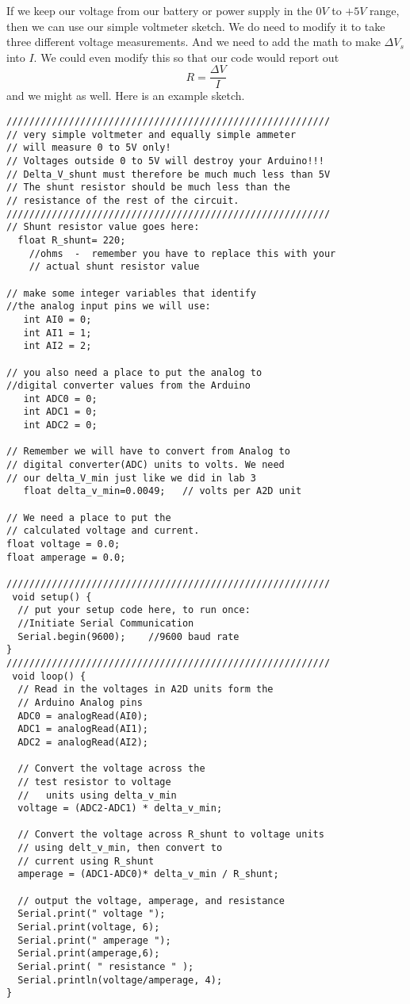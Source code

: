 If we keep our voltage from our battery or power supply in the $0\unit{V}$
to $+5\unit{V}$ range, then we can use our simple voltmeter sketch. We do
need to modify it to take three different voltage measurements. And we need
to add the math to make $\Delta V_{s}$ into $I.$ We could even modify this
so that our code would report out 
\begin{equation*}
R=\frac{\Delta V}{I}
\end{equation*}%
and we might as well. Here is an example sketch.
\begin{lstlisting}[language=Arduino]
 /////////////////////////////////////////////////////////
// very simple voltmeter and equally simple ammeter
// will measure 0 to 5V only!
// Voltages outside 0 to 5V will destroy your Arduino!!!
// Delta_V_shunt must therefore be much much less than 5V
// The shunt resistor should be much less than the
// resistance of the rest of the circuit.
/////////////////////////////////////////////////////////
// Shunt resistor value goes here:
  float R_shunt= 220;   
  	//ohms  -  remember you have to replace this with your 
  	// actual shunt resistor value
 
// make some integer variables that identify 
//the analog input pins we will use:
   int AI0 = 0;
   int AI1 = 1;
   int AI2 = 2;
 
// you also need a place to put the analog to 
//digital converter values from the Arduino
   int ADC0 = 0;
   int ADC1 = 0;
   int ADC2 = 0;
 
// Remember we will have to convert from Analog to 
// digital converter(ADC) units to volts. We need
// our delta_V_min just like we did in lab 3 
   float delta_v_min=0.0049;   // volts per A2D unit
  
// We need a place to put the 
// calculated voltage and current.
float voltage = 0.0;
float amperage = 0.0;
 
/////////////////////////////////////////////////////////
 void setup() {
  // put your setup code here, to run once:
  //Initiate Serial Communication
  Serial.begin(9600);    //9600 baud rate
}
/////////////////////////////////////////////////////////
 void loop() {
  // Read in the voltages in A2D units form the 
  // Arduino Analog pins
  ADC0 = analogRead(AI0); 
  ADC1 = analogRead(AI1);
  ADC2 = analogRead(AI2);
  
  // Convert the voltage across the 
  // test resistor to voltage 
  //   units using delta_v_min
  voltage = (ADC2-ADC1) * delta_v_min;
 
  // Convert the voltage across R_shunt to voltage units  
  // using delt_v_min, then convert to
  // current using R_shunt
  amperage = (ADC1-ADC0)* delta_v_min / R_shunt;
 
  // output the voltage, amperage, and resistance
  Serial.print(" voltage ");
  Serial.print(voltage, 6);  
  Serial.print(" amperage ");
  Serial.print(amperage,6);
  Serial.print( " resistance " );
  Serial.println(voltage/amperage, 4);
}
\end{lstlisting}

